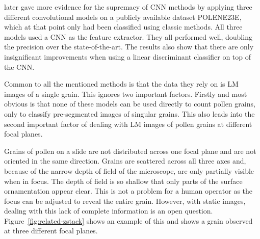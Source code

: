 {\cite{sevillano_improving_2018}} later gave more evidence for the supremacy of CNN methods by applying three different convolutional models on a publicly available dataset {POLENE23E}, which at that point only had been classified using classic methods.
All three models used a CNN as the feature extractor.
They all performed well, doubling the precision over the state-of-the-art.
The results also show that there are only insignificant improvements when using a linear discriminant classifier on top of the CNN\@.

Common to all the mentioned methods is that the data they rely on is LM images of a single grain.
This ignores two important factors. Firstly and most obvious is that none of these models can be used directly to count pollen grains, only to classify pre-segmented images of singular grains.
This also leads into the second important factor of dealing with LM images of pollen grains at different focal planes.

Grains of pollen on a slide are not distributed across one focal plane and are not oriented in the same direction.
Grains are scattered across all three axes and, because of the narrow depth of field of the microscope, are only partially visible when in focus.
The depth of field is so shallow that only parts of the surface ornamentation appear clear.
This is not a problem for a human operator as the focus can be adjusted to reveal the entire grain.
However, with static images, dealing with this lack of complete information is an open question. Figure~\ref{fig:related-zstack} shows an example of this and shows a grain observed at three different focal planes.

